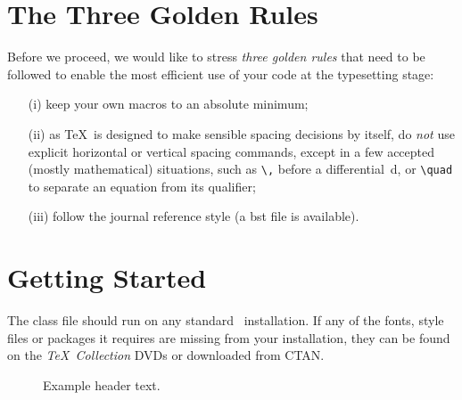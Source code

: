 \documentclass[times]{TRR}
\begin{document}
\section{The Three Golden Rules}
Before we proceed, we would like to stress \textit{three golden
rules} that need to be followed to enable the most efficient use
of your code at the typesetting stage:
\begin{enumerate}
\item[(i)] keep your own macros to an absolute minimum;

\item[(ii)] as \TeX\ is designed to make sensible spacing
decisions by itself, do \textit{not} use explicit horizontal or
vertical spacing commands, except in a few accepted (mostly
mathematical) situations, such as \verb"\," before a
differential~d, or \verb"\quad" to separate an equation from its
qualifier;

\item[(iii)] follow the journal reference style (a \textsf{\journalclassshort} bst file is available).
\end{enumerate}

\section{Getting Started} The \textsf{\journalclassshort} class file should run
on any standard \LaTeXe\ installation. If any of the fonts, style
files or packages it requires are missing from your installation,
they can be found on the \textit{\TeX\ Collection} DVDs or downloaded from
CTAN.

\begin{figure*}
\setlength{\fboxsep}{0pt}%
\setlength{\fboxrule}{0pt}%
\begin{center}
\end{center}
\caption{Example header text.\label{F1}}
\end{figure*}
\end{document}
